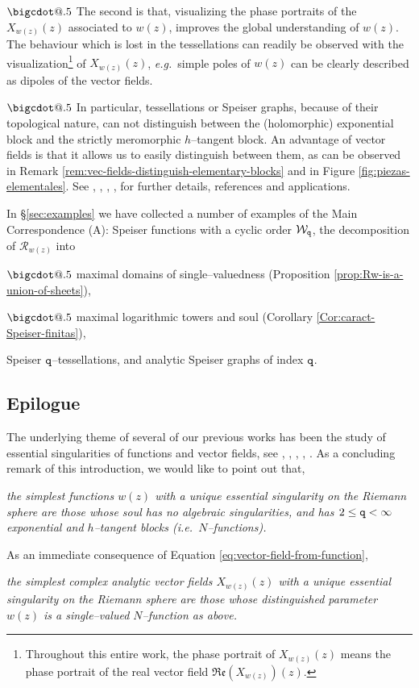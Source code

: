 \documentclass[final,3p,times]{elsarticle}
\makeatletter
\newcommand{\R}{\ensuremath{{\mathcal R}}}
\renewcommand{\Re}[1]{{\mathfrak{Re}\left(#1\right)}}
\newcommand*\bigcdot{\mathpalette\bigcdot@{.5}}
\newcommand*\bigcdot@[2]{\mathbin{\vcenter{\hbox{\scalebox{#2}{$\m@th#1\bullet$}}}}}
\theoremstyle{definition}
\makeatother
\begin{document}
\noindent
$\bigcdot$
The second is that, 
visualizing the phase portraits of the 
$X_{w(z)}(z)$ associated to $w(z)$, 
improves the global understanding of $w(z)$. 
The behaviour which is lost in the 
tessellations can readily be observed with the 
visualization\footnote{Throughout 
this entire work, the phase portrait of $X_{w(z)}(z)$
means the phase portrait of the
real vector field $\Re{X_{w(z)}}(z)$.
}  
of $X_{w(z)} (z)$, 
\emph{e.g.}\ simple poles of $w(z)$ can be clearly described 
as dipoles of the vector fields.

\noindent
$\bigcdot$
In particular, tessellations or Speiser graphs, because of their topological nature, 
can not distinguish between the (holomorphic) exponential block  
and the strictly meromorphic $h$--tangent block.
An advantage of vector fields is that it allows us to easily distinguish between them,
as can be observed in Remark \ref{rem:vec-fields-distinguish-elementary-blocks} and
in Figure \ref{fig:piezas-elementales}.
See \cite{Alvarez-Mucino-Solorza-Yee}, \cite{AlvarezMucino1}, \cite{AlvarezMucino2}, 
\cite{AlvarezMucino3}, \cite{AlvarezMucino4} for further details, references and 
applications.

\medskip
In \S\ref{sec:examples} 
we have collected a number of examples of the 
Main Correspondence (A):
Speiser functions with a cyclic order $\mathcal{W}_{\tt q}$,
the decomposition of $\R_{w(z)}$ into

\noindent
$\bigcdot$ 
maximal domains of single--valuedness 
(Proposition \ref{prop:Rw-is-a-union-of-sheets}),
 

\noindent
$\bigcdot$ 
maximal logarithmic towers and soul (Corollary \ref{Cor:caract-Speiser-finitas}),

\noindent 
Speiser $\tt q$--tessellations, and
analytic Speiser graphs of index $\tt q$.

\subsection{Epilogue} 
The underlying theme of several of our previous works has been the
study of essential singularities of functions and 
vector fields, see \cite{AlvarezMucino1}, \cite{Alvarez-Mucino-Solorza-Yee}, 
\cite{AlvarezMucino2}, \cite{AlvarezMucino3},
\cite{AlvarezMucino4}.
As a concluding remark of this introduction, we would like to point out that,

\begin{center}
{\it
the simplest functions $w(z)$ with a unique essential singularity on the Riemann sphere 
are those whose soul has no algebraic singularities, 
and has $ 2 \leq  {\tt q} < \infty$ exponential and $h$--tangent blocks 
(\emph{i.e.}\ $N$--functions).
}
\end{center}
As an immediate consequence of Equation \eqref{eq:vector-field-from-function}, 
\begin{center}
{\it
the simplest complex analytic vector fields $X_{w(z)}(z)$ with a unique essential singularity 
on the Riemann sphere are those whose distinguished parameter $w(z)$ 
is a single--valued $N$--function as above.
}
\end{center}
\end{document}
